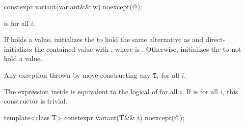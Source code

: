 %
\begin{itemdecl}
constexpr variant(variant&& w) noexcept(@\seebelow@);
\end{itemdecl}

\begin{itemdescr}
\pnum
\constraints
{} is  for all $i$.

\pnum
\effects
If  holds a value, initializes the  to hold the same
alternative as  and direct-initializes the contained value with
, where  is .
Otherwise, initializes the  to not hold a value.

\pnum
\throws
Any exception thrown by move-constructing any $\texttt{T}_i$ for all $i$.

\pnum
\remarks
The expression inside  is equivalent to the logical  of
 for all $i$.
If 
is  for all $i$, this constructor is trivial.
\end{itemdescr}

%
\begin{itemdecl}
template<class T> constexpr variant(T&& t) noexcept(@\seebelow@);
\end{itemdecl}

